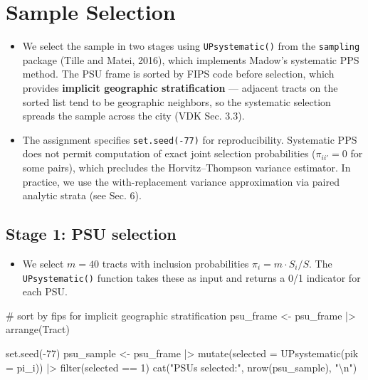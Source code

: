 \documentclass[
  11pt,
]{article}
\newenvironment{Shaded}{\begin{snugshade}}{\end{snugshade}}
\newcommand{\AttributeTok}[1]{\textcolor[rgb]{0.40,0.45,0.13}{#1}}
\newcommand{\CommentTok}[1]{\textcolor[rgb]{0.37,0.37,0.37}{#1}}
\newcommand{\DecValTok}[1]{\textcolor[rgb]{0.68,0.00,0.00}{#1}}
\newcommand{\FunctionTok}[1]{\textcolor[rgb]{0.28,0.35,0.67}{#1}}
\newcommand{\NormalTok}[1]{\textcolor[rgb]{0.00,0.23,0.31}{#1}}
\newcommand{\OtherTok}[1]{\textcolor[rgb]{0.00,0.23,0.31}{#1}}
\newcommand{\SpecialCharTok}[1]{\textcolor[rgb]{0.37,0.37,0.37}{#1}}
\newcommand{\StringTok}[1]{\textcolor[rgb]{0.13,0.47,0.30}{#1}}
\providecommand{\tightlist}{%
  \setlength{\itemsep}{0pt}\setlength{\parskip}{0pt}}\usepackage{longtable,booktabs,array}
\begin{document}
\section{Sample Selection}\label{sec-selection}

\begin{itemize}
\item
  We select the sample in two stages using \texttt{UPsystematic()} from
  the \texttt{sampling} package (Tille and Matei, 2016), which
  implements Madow's systematic PPS method. The PSU frame is sorted by
  FIPS code before selection, which provides \textbf{implicit geographic
  stratification} --- adjacent tracts on the sorted list tend to be
  geographic neighbors, so the systematic selection spreads the sample
  across the city (VDK Sec. 3.3).
\item
  The assignment specifies \texttt{set.seed(-77)} for reproducibility.
  Systematic PPS does not permit computation of exact joint selection
  probabilities (\(\pi_{ii'} = 0\) for some pairs), which precludes the
  Horvitz--Thompson variance estimator. In practice, we use the
  with-replacement variance approximation via paired analytic strata
  (see Sec. 6).
\end{itemize}

\subsection{Stage 1: PSU selection}\label{stage-1-psu-selection}

\begin{itemize}
\tightlist
\item
  We select \(m = 40\) tracts with inclusion probabilities
  \(\pi_i = m \cdot S_i / S\). The \texttt{UPsystematic()} function
  takes these as input and returns a 0/1 indicator for each PSU.
\end{itemize}

\begin{Shaded}
\begin{Highlighting}[]
\CommentTok{\# sort by fips for implicit geographic stratification}
\NormalTok{psu\_frame }\OtherTok{\textless{}{-}}\NormalTok{ psu\_frame }\SpecialCharTok{|\textgreater{}} \FunctionTok{arrange}\NormalTok{(Tract)}

\FunctionTok{set.seed}\NormalTok{(}\SpecialCharTok{{-}}\DecValTok{77}\NormalTok{)}
\NormalTok{psu\_sample }\OtherTok{\textless{}{-}}\NormalTok{ psu\_frame }\SpecialCharTok{|\textgreater{}}
  \FunctionTok{mutate}\NormalTok{(}\AttributeTok{selected =} \FunctionTok{UPsystematic}\NormalTok{(}\AttributeTok{pik =}\NormalTok{ pi\_i)) }\SpecialCharTok{|\textgreater{}}
  \FunctionTok{filter}\NormalTok{(selected }\SpecialCharTok{==} \DecValTok{1}\NormalTok{)}
\FunctionTok{cat}\NormalTok{(}\StringTok{"PSUs selected:"}\NormalTok{, }\FunctionTok{nrow}\NormalTok{(psu\_sample), }\StringTok{"}\SpecialCharTok{\textbackslash{}n}\StringTok{"}\NormalTok{)}
\end{Highlighting}
\end{Shaded}
\end{document}
